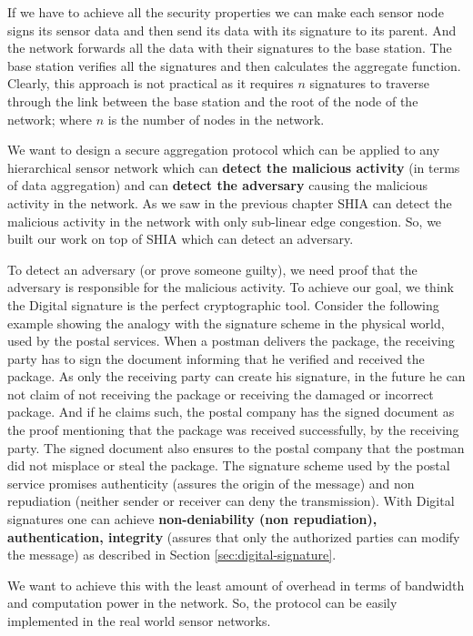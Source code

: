 	If we have to achieve all the security properties we can make each sensor node signs its sensor data and then send its data with its signature to its parent.
	And the network forwards all the data with their signatures to the base station.
	The base station verifies all the signatures and then calculates the aggregate function.
	Clearly, this approach is not practical as it requires $n$ signatures to traverse through the link between the base station and the root of the node of the network; where $n$ is the number of nodes in the network.

	We want to design a secure aggregation protocol which can be applied to any hierarchical sensor network which can \textbf{detect the malicious activity} (in terms of data aggregation) and can \textbf{detect the adversary} causing the malicious activity in the network.  
	As we saw in the previous chapter SHIA can detect the malicious activity in the network with only sub-linear edge congestion.
	So, we built our work on top of SHIA which can detect an adversary.

	To detect an adversary (or prove someone guilty), we need proof that the adversary is responsible for the malicious activity.	 
	To achieve our goal, we think the Digital signature is the perfect cryptographic tool.
	Consider the following example showing the analogy with the signature scheme in the physical world, used by the postal services.
	When a postman delivers the package, the receiving party has to sign the document informing that he verified and received the package.
	As only the receiving party can create his signature, in the future he can not claim of not receiving the package or receiving the damaged or incorrect package. 
	And if he claims such, the postal company has the
	signed document as the proof mentioning that the package was received successfully, by the receiving party.
	The signed document also ensures to the postal company that the postman did not misplace or steal the package.
	The signature scheme used by the postal service promises authenticity (assures the origin of the message) and non repudiation (neither sender or receiver can deny the transmission).
	With Digital signatures one can achieve \textbf{non-deniability  (non repudiation), authentication, integrity} (assures that only the authorized parties can modify the message) as described in Section \ref{sec:digital-signature}.
	
	We want to achieve this with the least amount of overhead in terms of bandwidth and computation power in the network.
	So, the protocol can be easily implemented in the real world sensor networks.
	
